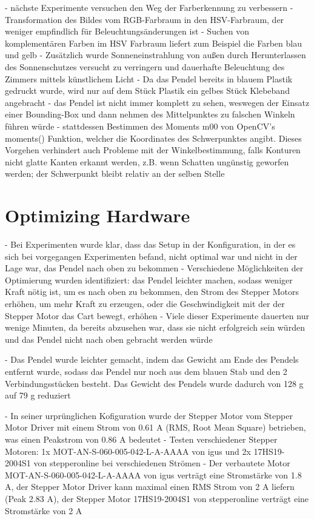 - nächste Experimente versuchen den Weg der Farberkennung zu verbessern
- Transformation des Bildes vom RGB-Farbraum in den HSV-Farbraum, der weniger empfindlich für Beleuchtungsänderungen ist
- Suchen von komplementären Farben im HSV Farbraum liefert zum Beispiel die Farben blau und gelb
- Zusätzlich wurde Sonneneinstrahlung von außen durch Herunterlassen des Sonnenschutzes versucht zu verringern und dauerhafte Beleuchtung des Zimmers mittels künstlichem Licht 
- Da das Pendel bereits in blauem Plastik gedruckt wurde, wird nur auf dem Stück Plastik ein gelbes Stück Klebeband angebracht
- das Pendel ist nicht immer komplett zu sehen, weswegen der Einsatz einer Bounding-Box und dann nehmen des Mittelpunktes zu falschen Winkeln führen würde
- stattdessen Bestimmen des Moments m00 von OpenCV's moments() Funktion, welcher die Koordinates des Schwerpunktes angibt. Dieses Vorgehen verhindert auch Probleme mit der Winkelbestimmung, falls Konturen nicht glatte Kanten erkannt werden, z.B. wenn Schatten ungünstig geworfen werden; der Schwerpunkt bleibt relativ an der selben Stelle

\section{Optimizing Hardware}
- Bei Experimenten wurde klar, dass das Setup in der Konfiguration, in der es sich bei vorgegangen Experimenten befand, nicht optimal war und nicht in der Lage war, das Pendel nach oben zu bekommen
- Verschiedene Möglichkeiten der Optimierung wurden identifiziert: das Pendel leichter machen, sodass weniger Kraft nötig ist, um es nach oben zu bekommen, den Strom des Stepper Motors erhöhen, um mehr Kraft zu erzeugen, oder die Geschwindigkeit mit der der Stepper Motor das Cart bewegt, erhöhen
- Viele dieser Experimente dauerten nur wenige Minuten, da bereits abzusehen war, dass sie nicht erfolgreich sein würden und das Pendel nicht nach oben gebracht werden würde

- Das Pendel wurde leichter gemacht, indem das Gewicht am Ende des Pendels entfernt wurde, sodass das Pendel nur noch aus dem blauen Stab und den 2 Verbindungsstücken besteht. Das Gewicht des Pendels wurde dadurch von 128 g auf 79 g reduziert

- In seiner urprünglichen Kofiguration wurde der Stepper Motor vom Stepper Motor Driver mit einem Strom von 0.61 A (RMS, Root Mean Square) betrieben, was einen Peakstrom von 0.86 A bedeutet
- Testen verschiedener Stepper Motoren: 1x MOT-AN-S-060-005-042-L-A-AAAA von igus und 2x 17HS19-2004S1 von stepperonline bei verschiedenen Strömen
- Der verbautete Motor MOT-AN-S-060-005-042-L-A-AAAA von igus verträgt eine Stromstärke von 1.8 A, der Stepper Motor Driver kann maximal einen RMS Strom von 2 A liefern (Peak 2.83 A), der Stepper Motor 17HS19-2004S1 von stepperonline verträgt eine Stromstärke von 2 A 


